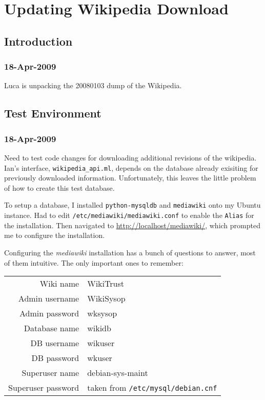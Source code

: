 \chapter{Updating Wikipedia Download}

\section{Introduction}

\subsection{18-Apr-2009}

Luca is unpacking the 20080103 dump of the Wikipedia.

\section{Test Environment}

\subsection{18-Apr-2009}

Need to test code changes for downloading additional revisions
of the wikipedia.
Ian's interface, \texttt{wikipedia\_api.ml}, depends on the database
already exisiting for previously downloaded information.
Unfortunately, this leaves the little problem of how to create
this test database.

To setup a database, I installed \texttt{python-mysqldb}
and \texttt{mediawiki} onto my Ubuntu instance.
Had to edit \texttt{/etc/mediawiki/mediawiki.conf} to 
enable the \texttt{Alias} for the installation.
Then navigated to \url{http://localhost/mediawiki/},
which prompted me to configure the installation.

Configuring the \textit{mediawiki} installation has a
bunch of questions to answer, most of them intuitive.
The only important ones to remember:
\begin{tabular}{r l}
Wiki name & WikiTrust \\
Admin username & WikiSysop \\
Admin password & wksysop \\
Database name & wikidb \\
DB username & wikuser \\
DB password & wkuser \\
Superuser name & debian-sys-maint \\
Superuser password & taken from \texttt{/etc/mysql/debian.cnf} \\
\end{tabular}


